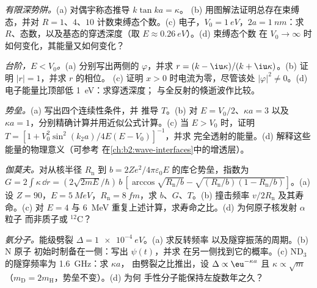 \begin{exercise}[$\star\star$]\label{exo:b2:potential-wells-tunneling:6}
\emph{有限深势阱。}(a) 对偶宇称态推导 $k\tan ka = \kappa$。
(b) 用图解法证明总存在束缚态，并对
$R = 1$、$4$、$10$ 计数束缚态个数。(c) 电子，$V_0 = \qty{1}{eV}$，$2a = \qty{1}{nm}$：求
$R$、态数，以及基态的穿透深度（取
$E \approx \qty{0.26}{eV}$）。(d) 束缚态个数
在 $V_0 \to \infty$ 时如何变化，其能量又如何变化？
\end{exercise}

\begin{exercise}[$\star\star$]\label{exo:b2:potential-wells-tunneling:7}
\emph{台阶，$E < V_0$。}(a) 分别写出两侧的 $\varphi$，并求 $r =
(k - \iu\kappa)/(k + \iu\kappa)$。(b) 证明 $|r| = 1$，并求 $r$ 的相位。
(c) 证明 $x > 0$ 时电流为零，尽管该处 $|\varphi|^2 \ne
0$。(d) 电子能量比顶部低 \qty{1}{eV}：求穿透深度；
与全反射的倏逝波作比较。
\end{exercise}

\begin{exercise}[$\star\star$]\label{exo:b2:potential-wells-tunneling:8}
\emph{势垒。}(a) 写出四个连续性条件，并
推导 $T$。(b) 对 $E =
V_0/2$、$\kappa a = 3$ 以及 $\kappa a = 1$，分别精确计算并用近似公式计算。(c) 当 $E > V_0$ 时，证明 $T = [1 +
V_0^2\sin^2(k_2a)/4E(E - V_0)]^{-1}$，并求
完全透射的能量。(d) 解释这些能量的物理意义（可参考
在\cref{ch:b2:wave-interfaces}中的增透层）。
\end{exercise}

\begin{exercise}[$\star\star$]\label{exo:b2:potential-wells-tunneling:9}
\emph{伽莫夫。}对从核半径 $R_{\text{n}}$
到 $b = 2Ze^2/4\pi\varepsilon_0E$ 的库仑势垒，指数为 $G = 2\int\kappa\,\dd r =
(2\sqrt{2mE}/\hbar)\,b\,[\arccos\sqrt{R_{\text{n}}/b} - \sqrt{(R_{\text{n}}/b)(1 -
R_{\text{n}}/b)}]$。(a) 设 $Z = 90$，$E = \qty{5}{MeV}$，$R_{\text{n}} = \qty{8}{fm}$，求
$b$、$G$、$T$。(b) 撞击频率 $v/2R_{\text{n}}$ 及其寿命。(c)
对 $E = 4$ 与 \qty{6}{MeV} 重复上述计算，求寿命之比。(d) 为何原子核发射 $\alpha$ 粒子
而非质子或 $^{12}$C？
\end{exercise}

\begin{exercise}[$\star\star\star$]\label{exo:b2:potential-wells-tunneling:10}
\emph{氨分子。}能级劈裂 $\Delta = \qty{1e-4}{eV}$。(a) 求反转频率
以及隧穿振荡的周期。(b) N 原子
初始时制备在一侧：写出 $\psi(t)$，并求
在另一侧找到它的概率。(c) ND$_3$ 的隧穿频率为 \qty{1.6}{GHz}：求 $\kappa a$，
由劈裂之比推出，设 $\Delta \propto \eu^{-\kappa a}$ 且 $\kappa
\propto\sqrt m$（$m_{\text{D}} = 2m_{\text{H}}$，势垒不变）。(d) 为何
手性分子能保持左旋数年之久？
\end{exercise}

